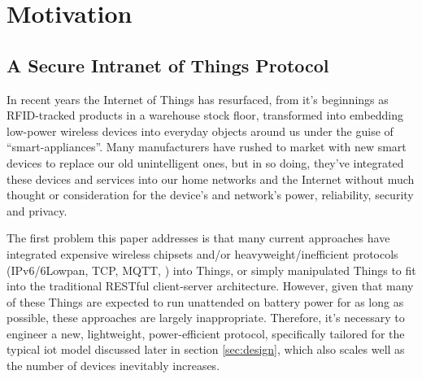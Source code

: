 \documentclass[conference]{./sty/IEEEtran}
\begin{document}

\section{Motivation} %
\label{sec:motivation}
\subsection{A Secure Intranet of Things Protocol} %
\label{sub:intranet_of_things_protocol}
In recent years the Internet of Things has resurfaced, from it's beginnings as RFID-tracked products in a warehouse stock floor, transformed into embedding low-power wireless devices into everyday objects around us under the guise of ``smart-appliances''. Many manufacturers have rushed to market with new smart devices to replace our old unintelligent ones, but in so doing, they've integrated these devices and services into our home networks and the Internet without much thought or consideration for the device's and network's power, reliability, security and privacy. 

The first problem this paper addresses is that many current approaches have integrated expensive wireless chipsets and/or heavyweight/inefficient protocols (IPv6/6Lowpan, TCP, MQTT\cite{MQTT}, \cite{xAP}) into Things, or simply manipulated Things to fit into the traditional RESTful client-server architecture\cite{IETF_COAP_HTTP}. However, given that many of these Things are expected to run unattended on battery power for as long as possible, these approaches are largely inappropriate. Therefore, it's necessary to engineer a new, lightweight, power-efficient protocol, specifically tailored for the typical iot model discussed later in section \ref{sec:design}, which also scales well as the number of devices inevitably increases. 
\end{document}
